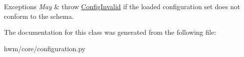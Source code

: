 \begin{DoxyExceptions}{Exceptions}
{\em May} & throw \hyperlink{classhwm_1_1core_1_1configuration_1_1_config_invalid}{Config\-Invalid} if the loaded configuration set does not conform to the schema. \\
\hline
\end{DoxyExceptions}


The documentation for this class was generated from the following file\-:\begin{DoxyCompactItemize}
\item 
hwm/core/configuration.\-py\end{DoxyCompactItemize}
